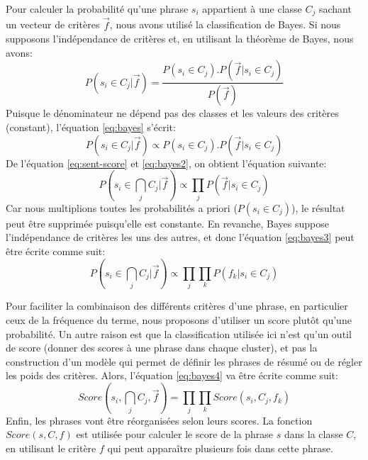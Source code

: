 \documentclass[a4paper,12pt,oneside]{../use/ESIthesis}
\begin{document}
Pour calculer la probabilité qu'une phrase $s_i$ appartient à une classe $C_j$ sachant un vecteur de critères $\overrightarrow{f}$, nous avons utilisé la classification de Bayes. 
Si nous supposons l'indépendance de critères et, en utilisant la théorème de Bayes, nous avons:
\begin{equation}
\label{eq:bayes}
P(s_i \in C_j | \overrightarrow{f}) = 
\frac{P(s_i \in C_j) . P(\overrightarrow{f} | s_i \in C_j) }{P(\overrightarrow{f})}
\end{equation}
Puisque le dénominateur ne dépend pas des classes et les valeurs des critères (constant), l'équation \ref{eq:bayes} s'écrit:
\begin{equation}
\label{eq:bayes2}
P(s_i \in C_j | \overrightarrow{f}) \propto 
P(s_i \in C_j) . P(\overrightarrow{f} | s_i \in C_j)
\end{equation}
De l'équation \ref{eq:sent-score} et \ref{eq:bayes2}, on obtient l'équation suivante:
\begin{equation}
\label{eq:bayes3}
P(s_i \in \bigcap_{j} C_j | \overrightarrow{f}) \propto 
\prod_{j} P(\overrightarrow{f} | s_i \in C_j)
\end{equation}
Car nous multiplions toutes les probabilités a priori ($P(s_i \in C_j)$), le résultat peut être supprimée puisqu'elle est constante. 
En revanche, Bayes suppose l'indépendance de critères les uns des autres, et donc l'équation \ref{eq:bayes3} peut être écrite comme suit:
\begin{equation}
\label{eq:bayes4}
P(s_i \in \bigcap_{j} C_j | \overrightarrow{f}) \propto 
\prod_{j} \prod_{k} P(f_k | s_i \in C_j)
\end{equation}

Pour faciliter la combinaison des différents critères d'une phrase, en particulier ceux de la fréquence du terme, nous proposons d'utiliser un score plutôt qu'une probabilité. 
Un autre raison est que la classification utilisée ici n'est qu'un outil de score (donner des scores à une phrase dans chaque cluster), et pas la construction d'un modèle qui permet de définir les phrases de résumé ou de régler les poids des critères. 
Alors, l'équation \ref{eq:bayes4} va être écrite comme suit:
\begin{equation}
\label{eq:class-score}
Score(s_i , \bigcap_{j} C_j , \overrightarrow{f}) = 
\prod_{j} \prod_{k} Score(s_i , C_j , f_k )
\end{equation}
Enfin, les phrases vont être réorganisées selon leurs scores. 
La fonction $ Score( s , C , f ) $ est utilisée pour calculer le score de la phrase $ s $ dans la classe $ C $, en utilisant le critère $ f $ qui peut apparaître plusieurs fois dans cette phrase. 
\end{document}
